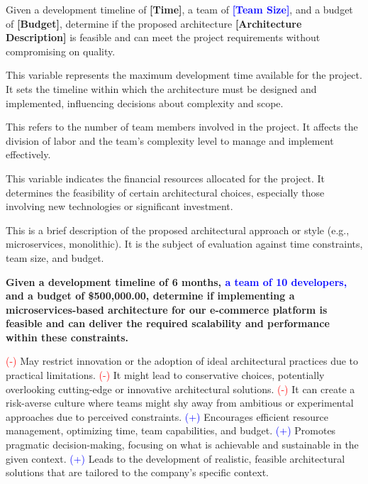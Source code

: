  Given a development timeline of \textcolor{mycolorgreen}{\textbf{[Time]}}, a team of \textcolor{blue}{\textbf{[Team Size]}}, and a budget of \textcolor{mycolorpink}{\textbf{[Budget]}}, determine if the proposed architecture \textcolor{mycolororange}{\textbf{[Architecture Description]}} is feasible and can meet the project requirements without compromising on quality.

\MyParaBold{\textcolor{mycolorgreen}{[Time]:}}This variable represents the maximum development time available for the project. It sets the timeline within which the architecture must be designed and implemented, influencing decisions about complexity and scope. 

\MyParaBold{\textcolor{blue}{[Team Size]:}}This refers to the number of team members involved in the project. It affects the division of labor and the team's complexity level to manage and implement effectively. 

\MyParaBold{\textcolor{mycolorpink}{[Budget]:}}This variable indicates the financial resources allocated for the project. It determines the feasibility of certain architectural choices, especially those involving new technologies or significant investment. 

\MyParaBold{\textcolor{mycolororange}{[Architecture Description]:}}This is a brief description of the proposed architectural approach or style (e.g., microservices, monolithic). It is the subject of evaluation against time constraints, team size, and budget.
       
\textbf{\textcolor{mycolorgreen}{Given a development timeline of 6 months, }\textcolor{blue}{a team of 10 developers, }\textcolor{mycolorpink}{and a budget of \$500,000.00, }\textcolor{mycolororange}{determine if implementing a microservices-based architecture for our e-commerce platform is feasible and can deliver the required scalability and performance within these constraints.}
}

\newline
\textcolor{red}{(-)} May restrict innovation or the adoption of ideal architectural practices due to practical limitations.\newline
\textcolor{red}{(-)} It might lead to conservative choices, potentially overlooking cutting-edge or innovative architectural solutions.\newline
\textcolor{red}{(-)} It can create a risk-averse culture where teams might shy away from ambitious or experimental approaches due to perceived constraints.\newline
\textcolor{blue}{(+)} Encourages efficient resource management, optimizing time, team capabilities, and budget.\newline
\textcolor{blue}{(+)} Promotes pragmatic decision-making, focusing on what is achievable and sustainable in the given context.\newline
\textcolor{blue}{(+)} Leads to the development of realistic, feasible architectural solutions that are tailored to the company's specific context.


